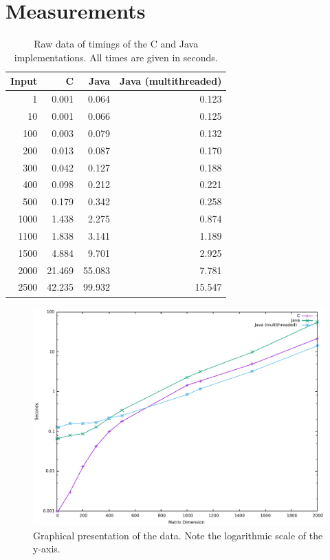 \documentclass{article}
\begin{document}
	\section{Measurements}
	\begin{table}[H]
		\centering
		\begin{tabular}{|r|r|r|r|}
			\hline
			Input	& C			& Java		& Java (multithreaded)\\\hline
			1		&  0.001	&  0.064	& 0.123\\\hline
			10		&  0.001	&  0.066	& 0.125\\\hline
			100		&  0.003	&  0.079	& 0.132\\\hline
			200		&  0.013	&  0.087	& 0.170\\\hline
			300		&  0.042	&  0.127	& 0.188\\\hline
			400		&  0.098	&  0.212	& 0.221\\\hline
			500		&  0.179	&  0.342	& 0.258\\\hline
			1000	&  1.438	&  2.275	& 0.874\\\hline
			1100	&  1.838	&  3.141	& 1.189\\\hline
			1500	&  4.884	&  9.701	& 2.925\\\hline
			2000	& 21.469	& 55.083	& 7.781\\\hline
			2500	& 42.235	& 99.932	&15.547\\\hline
		\end{tabular}
		\caption{Raw data of timings of the C and Java implementations. All times are given in seconds.}
	\end{table}
	
	\begin{figure}[H]
		\includegraphics[width=\textwidth]{AppliedAlgorithmsMatrixMultiplicationPlots.pdf}
		\caption{Graphical presentation of the data. Note the logarithmic scale of the y-axis.}
		\label{fig:plots}
	\end{figure}
\end{document}
